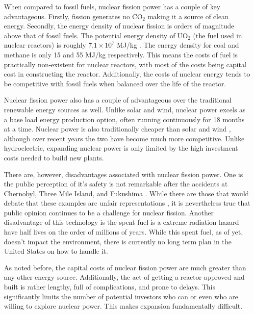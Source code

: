		\begin{figure}[h!]
			\centering
			\caption{}
		\end{figure}
		
		When compared to fossil fuels, nuclear fission power has a couple of key advantageous. Firstly, fission generates no CO$_2$ making it a source of clean energy. \cite{bibid} Secondly, the energy density of nuclear fission is orders of magnitude above that of fossil fuels. The potential energy density of UO$_2$ (the fuel used in nuclear reactors) is roughly $7.1\times10^7$ MJ/kg \cite{bibid}. The energy density for coal and methane is only 15 and 55 MJ/kg respectively. \cite{bibid} This means the costs of fuel is practically non-existent for nuclear reactors, with most of the costs being capital cost in constructing the reactor. \cite{bibid} Additionally, the costs of nuclear energy tends to be competitive with fossil fuels when balanced over the life of the reactor. \cite{bibid}
		
		Nuclear fission power also has a couple of advantageous over the traditional renewable energy sources as well. Unlike solar and wind, nuclear power excels as a base load energy production option, often running continuously for 18 months at a time. \cite{bibid} Nuclear power is also traditionally cheaper than solar and wind \cite{bibid}, although over recent years the two have become much more competitive. \cite{bibid} Unlike hydroelectric, expanding nuclear power is only limited by the high investment costs needed to build new plants. 
		
		There are, however, disadvantages associated with nuclear fission power. One is the public perception of it's safety is not remarkable after the accidents at Chernobyl, \cite{bibid} Three Mile Island, \cite{bibid} and Fukushima \cite{bibid}. While there are those that would debate that these examples are unfair representations \cite{bibid}, it is nevertheless true that public opinion continues to be a challenge for nuclear fission. Another disadvantage of this technology is the spent fuel is a extreme radiation hazard have half lives on the order of millions of years. \cite{bibid} While this spent fuel, as of yet, doesn't impact the environment, there is currently no long term plan in the United States on how to handle it. \cite{bibid} 
		
		As noted before, the capital costs of nuclear fission power are much greater than any other energy source. \cite{bibid} Additionally, the act of getting a reactor approved and built is rather lengthy, full of complications, and prone to delays. \cite{bibid} This significantly limits the number of potential investors who can or even who are willing to explore nuclear power. This makes expansion fundamentally difficult. 
		
